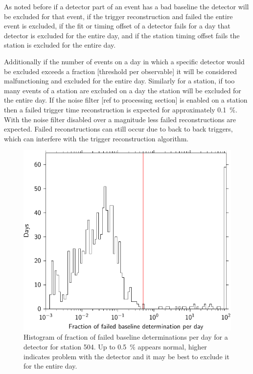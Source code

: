 As noted before if a detector part of an event has a bad baseline the detector will be excluded for that event, if the trigger reconstruction and failed the entire event is excluded, if the \mpv fit or timing offset of a detector fails for a day that detector is excluded for the entire day, and if the station timing offset fails the station is excluded for the entire day.

Additionally if the number of events on a day in which a specific detector would be excluded exceeds a fraction [threshold per observable] it will be considered malfunctioning and excluded for the entire day. Similarly for a station, if too many events of a station are excluded on a day the station will be excluded for the entire day. If the noise filter [ref to processing section] is enabled on a station then a failed trigger time reconstruction is expected for approximately \SI{0.1}{\percent}. With the noise filter disabled over a magnitude less failed reconstructions are expected. Failed reconstructions can still occur due to back to back triggers, which can interfere with the trigger reconstruction algorithm.


\begin{figure}
    \centering
    \includegraphics[width=0.7\linewidth]{plots/dataset/histogram_failed_baseline_504_4.pdf}
    \caption{Histogram of fraction of failed baseline determinations per day for a detector for station 504. Up to \SI{0.5}{\percent} appears normal, higher indicates problem with the detector and it may be best to exclude it for the entire day.}
    \label{fig:bad_baseline}
\end{figure}

